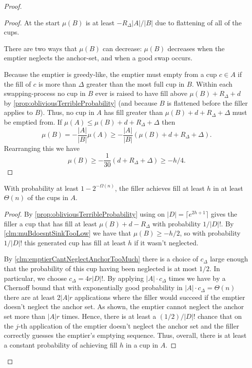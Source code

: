 \begin{proof}
\begin{proof}
  At the start $\mu(B)$ is at least $-R_\Delta |A|/|B|$ due to flattening
  of all of the cups.

  There are two ways that $\mu(B)$ can decrease: $\mu(B)$
  decreases when the emptier neglects the anchor-set, and
  when a good swap occurs. 

  Because the emptier is greedy-like, the emptier must empty from
  a cup $c\in A$ if the fill of $c$ is more than $\Delta$ greater
  than the most full cup in $B$. Within each swapping-process no
  cup in $B$ ever is raised to have fill above $\mu(B) + R_\Delta
  + d$ by \cref{prop:obliviousTerribleProbability} (and because
  $B$ is flattened before the filler applies \randalg to $B$).
  Thus, no cup in $A$ has fill greater than $\mu(B) + d +
  R_\Delta + \Delta$
  must be emptied from. If $\mu(A) \le \mu(B) + d +
  R_\Delta + \Delta$ then
  $$\mu(B) = -\frac{|A|}{|B|}\mu(A) \ge
  -\frac{|A|}{|B|}\left(\mu(B) + d + R_\Delta + \Delta\right).$$
  Rearranging this we have
  $$\mu(B) \ge -\frac{1}{30}(d + R_\Delta + \Delta) \ge -h/4.$$

\end{proof}

\begin{clm}
With probability at least $1-2^{-\Omega(n)}$, the filler achieves fill
at least $h$ in at least $\Theta(n)$ of the cups in $A$. 
\end{clm}
\begin{proof}
  By \cref{prop:obliviousTerribleProbability} using \randalg on
  $|D| = \lceil e^{2h+1} \rceil$ gives the filler a cup that
  has fill at least $\mu(B) + d-R_\Delta$ with probability
  $1/|D|!$. By \cref{clm:muBdoesntSinkTooLow} we have that
  $\mu(B) \ge -h/2$, so with probability $1/|D|!$ this generated
  cup has fill at least $h$ if it wasn't neglected.

  By \cref{clm:emptierCantNeglectAnchorTooMuch} there is a choice
  of $c_\Delta$ large enough that the probability of this cup
  having been neglected is at most $1/2$. In particular, we
  choose $c_\Delta = 4r|D|!$. By applying \randalg $|A|\cdot
  c_\Delta$ times we have by a Chernoff bound that with
  exponentially good probability in $|A|\cdot c_\Delta =
  \Theta(n)$ there are at least $2|A|r$ applications where the
  filler would succeed if the emptier doesn't neglect the anchor
  set. As shown, the emptier cannot
  neglect the anchor set more than $|A|r$ times. Hence, there
  is at least a $(1/2)/|D|!$ chance that on the $j$-th
  application of \randalg the emptier doesn't neglect the anchor
  set and the filler correctly guesses the emptier's emptying
  sequence. Thus, overall, there is at least a constant
  probability of achieving fill $h$ in a cup in $A$.


\end{proof}
\end{proof}
